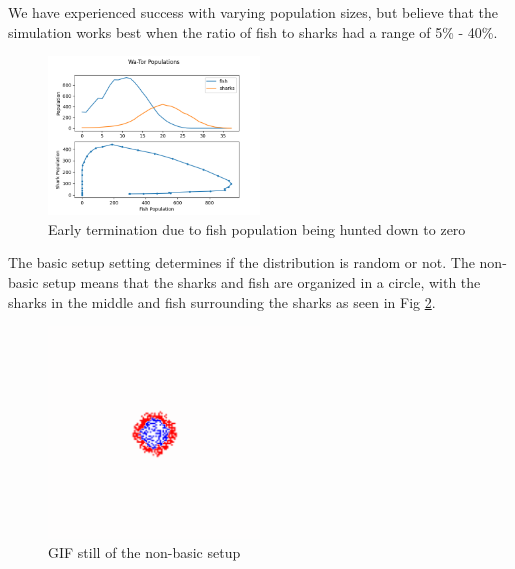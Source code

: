 \documentclass[12pt]{iopart} %
\begin{document}
We have experienced success with varying population sizes, but believe that the simulation works best when the ratio of fish to sharks had a range of 5\% - 40\%.

\begin{figure}[h!tbp]
  \begin{center}
  \item[]\includegraphics[width=0.5\textwidth]{figure27.png}
  \caption{\label{fig:figure27}
  Early termination due to fish population being hunted down to zero
  }
  \end{center}
\end{figure}

The basic setup setting determines if the distribution is random or not. 
The non-basic setup means that the sharks and fish are organized in a circle, with the sharks in the middle and fish surrounding the sharks as seen in Fig \ref{fig:figure28}.

\begin{figure}[h!tbp]
  \begin{center}
  \item[]\includegraphics[width=0.5\textwidth]{figure28.png}
  \caption{\label{fig:figure28}
  GIF still of the non-basic setup
  }
  \end{center}
\end{figure}
\end{document}
